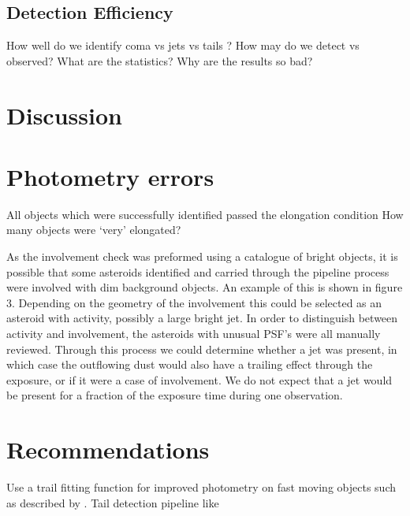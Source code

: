 \documentclass[iop,apj]{emulateapj}
\begin{document}
\subsection{Detection Efficiency}

How well do we identify coma vs jets vs tails ? How may do we detect vs observed? What are the statistics? Why are the results so bad?

\section{Discussion}

\section{Photometry errors}



All objects which were successfully identified passed the elongation condition
How many objects were `very' elongated?


As the involvement check was preformed using a catalogue of bright objects, it is possible that some asteroids identified and carried through the pipeline process were involved with dim background objects. An example of this is shown in figure 3. Depending on the geometry of the involvement this could be selected as an asteroid with activity, possibly a large bright jet. In order to distinguish between activity and involvement, the asteroids with unusual PSF's were all manually reviewed. Through this process we could determine whether a jet was present, in which case the outflowing dust would also have a trailing effect through the exposure, or if it were a case of involvement. We do not expect that a jet would be present for a fraction of the exposure time during one observation. 

\section{Recommendations }

Use a trail fitting function for improved photometry on fast moving objects such as described by \cite{veres12}.
Tail detection pipeline like \cite{sonnett11}




\end{document}
